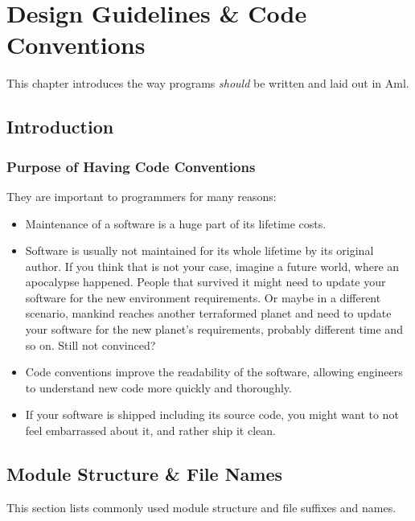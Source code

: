 
\chapter{Design Guidelines \& Code Conventions}

\minitoc

This chapter introduces the way programs {\em should} be written and laid out in Aml. 






\section{Introduction}

\subsection{Purpose of Having Code Conventions}

They are important to programmers for many reasons:
\begin{itemize}
\item Maintenance of a software is a huge part of its lifetime costs. 
\item Software is usually not maintained for its whole lifetime by its original author. If you think that is not your case, imagine a future world, where an apocalypse happened. People that survived it might need to update your software for the new environment requirements. Or maybe in a different scenario, mankind reaches another terraformed planet and need to update your software for the new planet’s requirements, probably different time and so on. Still not convinced? 
\item Code conventions improve the readability of the software, allowing engineers to understand new code more quickly and thoroughly. 
\item If your software is shipped including its source code, you might want to not feel embarrassed about it, and rather ship it clean. 
\end{itemize}






\section{Module Structure \& File Names}

This section lists commonly used module structure and file suffixes and names. 

